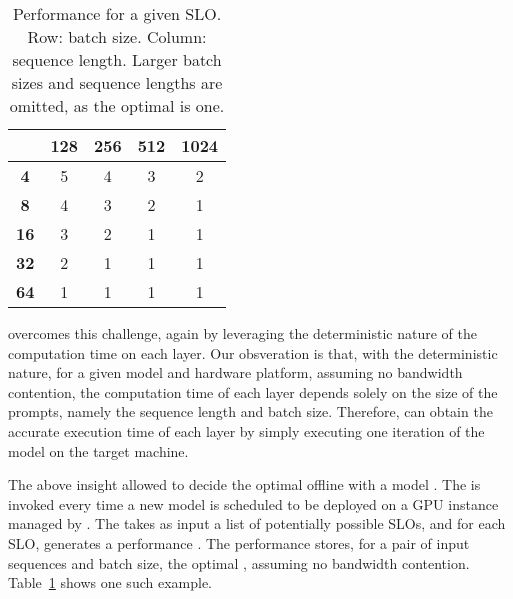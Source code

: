 \begin{table}[t]
    \centering
    \small %
    \begin{tabular}{c|cccc}
        \hline
        \textbf{} & \textbf{128} & \textbf{256} & \textbf{512} & \textbf{1024} \\ \hline
        \textbf{4}   & 5 & 4 & 3 & 2 \\
        \textbf{8}   & 4 & 3 & 2 & 1 \\
        \textbf{16}  & 3 & 2 & 1 & 1 \\
        \textbf{32}  & 2 & 1 & 1 & 1 \\
        \textbf{64}  & 1 & 1 & 1 & 1 \\  \hline
    \end{tabular}
    \vspace{0.6cm}
    \caption{Performance \record for a given SLO. 
 Row: batch size. Column: sequence length. Larger batch sizes and sequence lengths are omitted, as the optimal \interval is one.}
    \label{tab:batchtpotdecode}
\end{table}



%
\sys overcomes this challenge, again by leveraging the deterministic nature of the computation time on each layer.
%
Our obsveration is that, with the deterministic nature, for a given model and hardware platform, assuming no bandwidth contention, 
the computation time of each layer depends solely on 
the size of the prompts, namely the sequence length and batch size.  
%
Therefore, \sys can obtain the accurate execution time of each layer 
by simply executing one iteration of the model on the target machine.  
%  


%
The above insight allowed \sys to decide the optimal \interval offline with 
a model \analyzer. 
%
The \analyzer is invoked every time a new model is scheduled to 
be deployed on a GPU instance managed by \sys. 
%
The \analyzer takes as input a list of potentially possible SLOs, 
and for each SLO, generates a performance \record. 
%
The performance \record stores, for a pair of input sequences and batch size, 
the optimal \interval, assuming no bandwidth contention. 
%
Table~\ref{tab:batchtpotdecode} shows one such example. 

